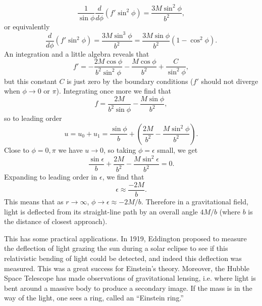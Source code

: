 $$\frac{1}{\sin\phi}\frac{d}{d\phi}(f'\sin^2\phi)=\frac{3M\sin^2\phi}{b^2},$$
or equivalently
$$\frac{d}{d\phi}(f'\sin^2\phi)=\frac{3M\sin^3\phi}{b^2}=\frac{3M\sin\phi}{b^2}(1-\cos^2\phi).$$
An integration and a little algebra reveals that
$$f'=-\frac{2M\cos\phi}{b^2\sin^2\phi}-\frac{M\cos\phi}{b^2}+\frac{C}{\sin^2\phi},$$
but this constant $C$ is just zero by the boundary conditions ($f'$ should not diverge when $\phi\to 0$ or $\pi$).
Integrating once more we find that
$$f=\frac{2M}{b^2\sin\phi} - \frac{M\sin\phi}{b^2},$$
so to leading order
$$u=u_0+u_1=\frac{\sin\phi}{b}+\left(\frac{2M}{b^2} - \frac{M\sin^2\phi}{b^2}\right).$$
Close to $\phi=0,\pi$ we have $u\to 0$, so taking $\phi=\epsilon$ small, we get
$$\frac{\sin\epsilon}{b}+\frac{2M}{b^2}-\frac{M\sin^2 \epsilon}{b^2}=0.$$ Expanding to leading order in $\epsilon$, we find that
$$\epsilon \approx \frac{-2M}{b}.$$ This means that as $r\to\infty$, $\phi\to\epsilon\approx -2M/b$.
Therefore in a gravitational field, light is deflected from its straight-line path by an overall angle $4M/b$ (where $b$ is the distance of closest approach).

This has some practical applications. In 1919, Eddington proposed to measure the deflection of light grazing the sun during a solar eclipse to see if this relativistic bending of light could be detected, and indeed this deflection was measured. This was a great success for Einstein's theory. Moreover, the Hubble Space Telescope has made observations of gravitational lensing, i.e. where light is bent around a massive body to produce a secondary image. If the mass is in the way of the light, one sees a ring, called an ``Einstein ring.'' 

